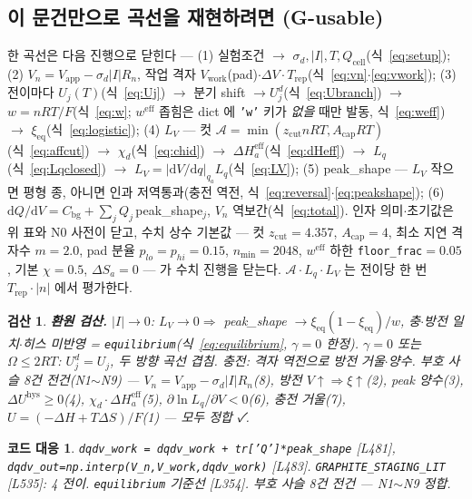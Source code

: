 \documentclass[11pt,a4paper]{article}
\newtheorem*{codebox}{코드 대응}
\newtheorem*{verifybox}{검산}
\newcommand{\dd}{\mathrm{d}}
\newcommand{\eff}{\mathrm{eff}}
\newcommand{\eq}{\mathrm{eq}}
\newcommand{\app}{\mathrm{app}}
\newcommand{\cell}{\mathrm{cell}}
\newcommand{\bg}{\mathrm{bg}}
\newcommand{\work}{\mathrm{work}}
\newcommand{\rep}{\mathrm{rep}}
\newcommand{\hys}{\mathrm{hys}}
\newcommand{\sgn}{\sigma_d}
\begin{document}
\subsection{이 문건만으로 곡선을 재현하려면 (G-usable)}
한 곡선은 다음 진행으로 닫힌다 — (1) 실험조건 $\to$ $\sgn,|I|,T,Q_\cell$(식~\eqref{eq:setup}); (2) $V_n=V_\app-\sgn|I|R_n$, 작업 격자 $V_\work$(pad)$\cdot\Delta V\cdot T_\rep$(식~\eqref{eq:vn}$\cdot$\eqref{eq:vwork}); (3) 전이마다 $U_j(T)$(식~\eqref{eq:Uj}) $\to$ 분기 shift $\to U_j^d$(식~\eqref{eq:Ubranch}) $\to$ $w=nRT/F$(식~\eqref{eq:w}; $w^\eff$ 좁힘은 dict 에 \texttt{'w'} 키가 \emph{없을} 때만 발동, 식~\eqref{eq:weff}) $\to$ $\xi_\eq$(식~\eqref{eq:logistic}); (4) $L_V$ — 컷 $\mathcal A=\min(z_{\mathrm{cut}}nRT,A_{\mathrm{cap}}RT)$(식~\eqref{eq:affcut}) $\to$ $\chi_d$(식~\eqref{eq:chid}) $\to$ $\Delta H_a^\eff$(식~\eqref{eq:dHeff}) $\to$ $L_q$(식~\eqref{eq:Lqclosed}) $\to$ $L_V=|\dd V/\dd q|_{q_a}L_q$(식~\eqref{eq:LV}); (5) peak\_shape — $L_V$ 작으면 평형 종, 아니면 인과 저역통과(충전 역전, 식~\eqref{eq:reversal}$\cdot$\eqref{eq:peakshape}); (6) $\dd Q/\dd V=C_\bg+\sum_jQ_j\,$peak\_shape$_j$, $V_n$ 역보간(식~\eqref{eq:total}). 인자 의미$\cdot$초기값은 위 표와 N0 사전이 닫고, 수치 상수 기본값 — 컷 $z_{\mathrm{cut}}=4.357$, $A_{\mathrm{cap}}=4$, 최소 지연 격자수 $m=2.0$, pad 분율 $p_{lo}=p_{hi}=0.15$, $n_{\min}=2048$, $w^\eff$ 하한 \texttt{floor\_frac}$=0.05$, 기본 $\chi=0.5$, $\Delta S_a=0$ — 가 수치 진행을 닫는다. $\mathcal A\cdot L_q\cdot L_V$ 는 전이당 한 번 $T_\rep\cdot|n|$ 에서 평가한다.

\begin{verifybox}
\textbf{환원 검산.} $|I|\to0$: $L_V\to0\Rightarrow$ peak\_shape $\to\xi_\eq(1-\xi_\eq)/w$, 충$\cdot$방전 일치$\cdot$히스 미반영 = \texttt{equilibrium}(식~\eqref{eq:equilibrium}, $\gamma=0$ 한정). $\gamma=0$ 또는 $\Omega\le2RT$: $U_j^d=U_j$, 두 방향 곡선 겹침. 충전: 격자 역전으로 방전 거울$\cdot$양수. 부호 사슬 8건 전건(N1$\sim$N9) — $V_n=V_\app-\sgn|I|R_n$(8), 방전 $V\!\uparrow\Rightarrow\xi\!\uparrow$(2), peak 양수(3), $\Delta U^\hys\ge0$(4), $\chi_d\cdot\Delta H_a^\eff$(5), $\partial\ln L_q/\partial V<0$(6), 충전 거울(7), $U=(-\Delta H+T\Delta S)/F$(1) — 모두 정합 ✓.
\end{verifybox}

\begin{codebox}
\texttt{dqdv\_work = dqdv\_work + tr['Q']*peak\_shape} [L481], \texttt{dqdv\_out=np.interp(V\_n,V\_work,dqdv\_work)} [L483]. \texttt{GRAPHITE\_STAGING\_LIT} [L535]: 4 전이. \texttt{equilibrium} 기준선 [L354]. 부호 사슬 8건 전건 — N1$\sim$N9 정합.
\end{codebox}
\end{document}
